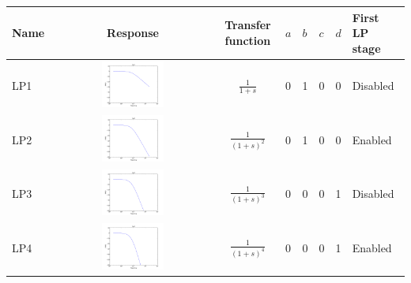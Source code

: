 \documentclass[a4paper,10pt]{article}
\begin{document}
\begin{tabular}{lcclllll}
\hline
Name & Response & Transfer function & $a$ & $b$ & $c$ & $d$ & First LP stage \\
\hline
LP1 & \includegraphics[width=0.4\textwidth]{response_lp1.pdf} & $\frac{1}{1 + s}$ & 0 & 1 & 0 & 0 & Disabled \\
\hline
LP2 & \includegraphics[width=0.4\textwidth]{response_lp2.pdf} & $\frac{1}{(1 + s)^2}$ & 0 & 1 & 0 & 0 & Enabled \\
\hline
LP3 & \includegraphics[width=0.4\textwidth]{response_lp3.pdf} & $\frac{1}{(1 + s)^3}$ & 0 & 0 & 0 & 1 & Disabled \\
\hline
LP4 & \includegraphics[width=0.4\textwidth]{response_lp4.pdf} & $\frac{1}{(1 + s)^4}$ & 0 & 0 & 0 & 1 & Enabled \\
\hline
\end{tabular}
\end{document}
